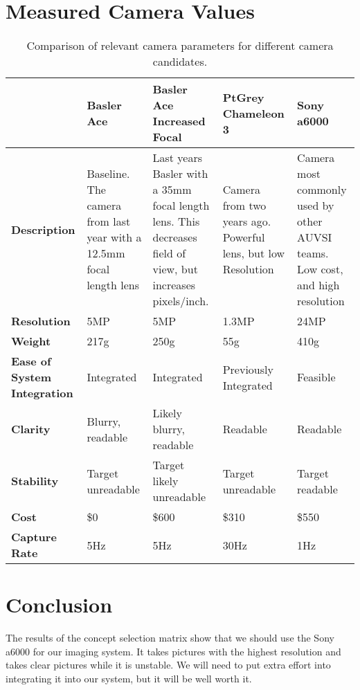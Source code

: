 \documentclass[]{auvsi_doc}
\begin{document}
\section{Measured Camera Values}
\begin{table}[H]
	\centering
	\caption{Comparison of relevant camera parameters for different camera candidates.}
	\begin{tabular}{|p{2.5cm}|p{2.9cm}|p{2.9cm}|p{2.9cm}|p{2.9cm}|}
	\hline
	\rowcolor[HTML]{C0C0C0}
& {\color[HTML]{000000} \textbf{Basler Ace}} & {\color[HTML]{000000} \textbf{Basler Ace Increased Focal}} & {\color[HTML]{000000} \textbf{PtGrey Chameleon 3}} & {\color[HTML]{000000} \textbf{Sony a6000}}\\ \hline
{\color[HTML]{000000} \textbf{Description}}	&	Baseline. The camera from last year with a 12.5mm focal length lens	&	Last years Basler with a 35mm focal length lens. This decreases field of view, but increases pixels/inch. &	Camera from two years ago. Powerful lens, but low Resolution	&	Camera most commonly used by other AUVSI teams. Low cost, and high resolution\\ \hline
{\color[HTML]{000000} \textbf{Resolution}}	&	5MP	&	5MP	&	1.3MP	&	24MP\\ \hline
{\color[HTML]{000000} \textbf{Weight}}	&	217g	&	250g	&	55g	&	410g\\ \hline
{\color[HTML]{000000} \textbf{Ease of System Integration}}	&	Integrated	&	Integrated	&	Previously Integrated	&	Feasible\\ \hline
{\color[HTML]{000000} \textbf{Clarity}}	&	Blurry, readable	&	Likely blurry, readable	&	Readable 	& Readable\\ \hline
{\color[HTML]{000000} \textbf{Stability}}	& Target unreadable	&	Target likely unreadable	&	Target unreadable	&	Target readable\\ \hline
{\color[HTML]{000000} \textbf{Cost}}	&	\$0 	&	\$600 	&	\$310	&	\$550\\ \hline
{\color[HTML]{000000} \textbf{Capture Rate}}	&	5Hz	&	5Hz	&	30Hz	&	1Hz\\ \hline
	\end{tabular}
\end{table}

\section{Conclusion}

The results of the concept selection matrix show that we should use the Sony a6000 for our imaging system.
It takes pictures with the highest resolution and takes clear pictures while it is unstable. We will need to put extra effort into integrating it into our system, but it will be well worth it.
\end{document}
